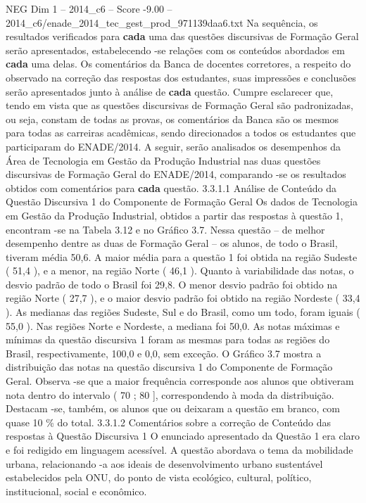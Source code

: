\begin{textsample}{NEG Dim 1 – 2014\_c6 – Score -9.00 – 2014\_c6/enade\_2014\_tec\_gest\_prod\_971139daa6.txt}
Na sequência, os resultados verificados para \textbf{cada} uma das questões discursivas de Formação Geral serão apresentados, estabelecendo -se relações com os conteúdos abordados em \textbf{cada} uma delas.
Os comentários da Banca de docentes corretores, a respeito do observado na correção das respostas dos estudantes, suas impressões e conclusões serão apresentados junto à análise de \textbf{cada} questão.
Cumpre esclarecer que, tendo em vista que as questões discursivas de Formação Geral são padronizadas, ou seja, constam de todas as provas, os comentários da Banca são os mesmos para todas as carreiras acadêmicas, sendo direcionados a todos os estudantes que participaram do ENADE/2014.
A seguir, serão analisados os desempenhos da Área de Tecnologia em Gestão da Produção Industrial nas duas questões discursivas de Formação Geral do ENADE/2014, comparando -se os resultados obtidos com comentários para \textbf{cada} questão. 3.3.1.1 Análise de Conteúdo da Questão Discursiva 1 do Componente de Formação Geral Os dados de Tecnologia em Gestão da Produção Industrial, obtidos a partir das respostas à questão 1, encontram -se na Tabela 3.12 e no Gráfico 3.7.
Nessa questão – de melhor desempenho dentre as duas de Formação Geral – os alunos, de todo o Brasil, tiveram média 50,6.
A maior média para a questão 1 foi obtida na região Sudeste ( 51,4 ), e a menor, na região Norte ( 46,1 ).
Quanto à variabilidade das notas, o desvio padrão de todo o Brasil foi 29,8.
O menor desvio padrão foi obtido na região Norte ( 27,7 ), e o maior desvio padrão foi obtido na região Nordeste ( 33,4 ).
As medianas das regiões Sudeste, Sul e do Brasil, como um todo, foram iguais ( 55,0 ).
Nas regiões Norte e Nordeste, a mediana foi 50,0.
As notas máximas e mínimas da questão discursiva 1 foram as mesmas para todas as regiões do Brasil, respectivamente, 100,0 e 0,0, sem exceção.
O Gráfico 3.7 mostra a distribuição das notas na questão discursiva 1 do Componente de Formação Geral.
Observa -se que a maior frequência corresponde aos alunos que obtiveram nota dentro do intervalo ( 70 ; 80 ], correspondendo à moda da distribuição.
Destacam -se, também, os alunos que ou deixaram a questão em branco, com quase 10 \% do total. 3.3.1.2 Comentários sobre a correção de Conteúdo das respostas à Questão Discursiva 1 O enunciado apresentado da Questão 1 era claro e foi redigido em linguagem acessível.
A questão abordava o tema da mobilidade urbana, relacionando -a aos ideais de desenvolvimento urbano sustentável estabelecidos pela ONU, do ponto de vista ecológico, cultural, político, institucional, social e econômico.

\end{textsample}
